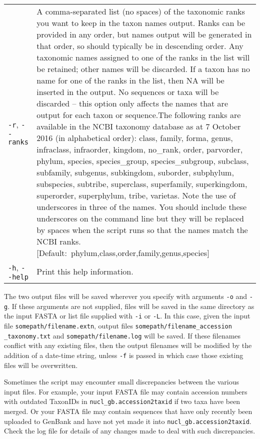 \documentclass[11pt]{amsart}
\begin{document}
\begin{longtable}{@{} p{1.4in} p{5.35in} @{}}
      \verb|-r|, \verb|--ranks|  & A comma-separated list (no spaces) of the taxonomic ranks you want to keep in the taxon names output. Ranks can be provided in any order, but names output will be generated in that order, so should typically be in descending order. Any taxonomic names assigned to one of the ranks in the list will be retained; other names will be discarded. If a taxon has no name for one of the ranks in the list, then NA will be inserted in the output. No sequences or taxa will be discarded -- this option only affects the names that are output for each taxon or sequence.The following ranks are available in the NCBI taxonomy database as at 7 October 2016 (in alphabetical order): class, family, forma, genus, \mbox{infraclass}, \mbox{infraorder}, kingdom, no\_rank, order, parvorder, phylum, species, species\_group, species\_subgroup, subclass, subfamily, subgenus, \mbox{subkingdom}, \mbox{suborder}, \mbox{subphylum}, subspecies, subtribe, superclass, superfamily, \mbox{superkingdom}, \mbox{superorder}, superphylum, tribe, varietas. Note the use of underscores in three of the names. You should include these underscores on the command line but they will be replaced by spaces when the script runs so that the names match the NCBI ranks. \mbox{[Default:~phylum,class,order,family,genus,species]} \\
      \verb|-h|, \verb|--help| & Print this help information.
\end{longtable}

The two output files will be saved wherever you specify with arguments \verb|-o| and \verb|-g|. If these arguments are not supplied, files will be saved in the same directory as the input FASTA or list file supplied with \verb|-i| or \verb|-L|. In this case, given the input file \verb|somepath/filename.extn|, output files \verb|somepath/filename_accession| \verb|_taxonomy.txt| and \verb|somepath/filename.log| will be saved. If these filenames conflict with any existing files, then the output filenames will be modified by the addition of a date-time string, unless \verb|-f| is passed in which case those existing files will be overwritten.

Sometimes the script may encounter small discrepancies between the various input files. For example, your input FASTA file may contain accession numbers with outdated TaxonIDs in \verb|nucl_gb.accession2taxid| if two taxa have been merged. Or your FASTA file may contain sequences that have only recently been uploaded to GenBank and have not yet made it into \verb|nucl_gb.accession2taxid|. Check the log file for details of any changes made to deal with such discrepancies.
\end{document}
